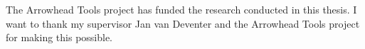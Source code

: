 The Arrowhead Tools project has funded the research conducted in this thesis.
I want to thank my supervisor Jan van Deventer and the Arrowhead Tools project for making this possible.